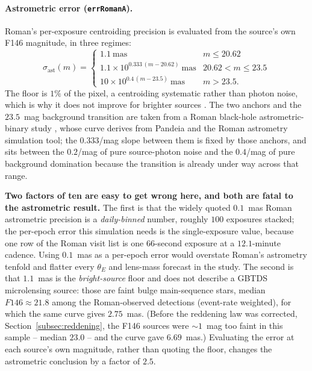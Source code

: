\documentclass[english,10pt,a4paper]{article}
\begin{document}
	\paragraph{Astrometric error (\texttt{errRomanA}).} Roman's per-exposure centroiding precision is evaluated from the source's own F146 magnitude, in three regimes:
	\[
	\sigma_{\mathrm{ast}}(m) = \begin{cases}
	1.1~\mathrm{mas} & m \le 20.62\\
	1.1\times10^{0.333\,(m-20.62)}~\mathrm{mas} & 20.62 < m \le 23.5\\
	10\times10^{0.4\,(m-23.5)}~\mathrm{mas} & m > 23.5.
	\end{cases}
	\]
	The floor is $1\%$ of the pixel, a centroiding systematic rather than photon noise, which is why it does not improve for brighter sources \cite{Sanderson2019WFIRSTastrometry}. The two anchors and the $23.5$~mag background transition are taken from a Roman black-hole astrometric-binary study \cite{RomanBHbinaries}, whose curve derives from Pandeia and the Roman astrometry simulation tool; the $0.333$/mag slope between them is fixed by those anchors, and sits between the $0.2$/mag of pure source-photon noise and the $0.4$/mag of pure background domination because the transition is already under way across that range.
	
	\textbf{Two factors of ten are easy to get wrong here, and both are fatal to the astrometric result.} The first is that the widely quoted $0.1$~mas Roman astrometric precision is a \emph{daily-binned} number, roughly $100$ exposures stacked; the per-epoch error this simulation needs is the single-exposure value, because one row of the Roman visit list is one $66$-second exposure at a $12.1$-minute cadence. Using $0.1$~mas as a per-epoch error would overstate Roman's astrometry tenfold and flatter every $\theta_E$ and lens-mass forecast in the study. The second is that $1.1$~mas is the \emph{bright-source} floor and does not describe a GBTDS microlensing source: those are faint bulge main-sequence stars, median $F146\approx21.8$ among the Roman-observed detections (event-rate weighted), for which the same curve gives $2.75$~mas. (Before the reddening law was corrected, Section~\ref{subsec:reddening}, the F146 sources were $\sim\!1$~mag too faint in this sample -- median $23.0$ -- and the curve gave $6.69$~mas.) Evaluating the error at each source's own magnitude, rather than quoting the floor, changes the astrometric conclusion by a factor of $2.5$.
	
\end{document}

